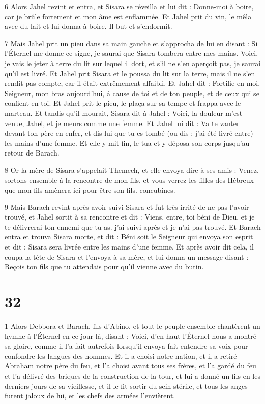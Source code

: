 \par 6 Alors Jahel revint et entra, et Sisara se réveilla et lui dit : Donne-moi à boire, car je brûle fortement et mon âme est enflammée. Et Jahel prit du vin, le mêla avec du lait et lui donna à boire. Il but et s'endormit.

\par 7 Mais Jahel prit un pieu dans sa main gauche et s'approcha de lui en disant : Si l'Éternel me donne ce signe, je saurai que Sisara tombera entre mes mains. Voici, je vais le jeter à terre du lit sur lequel il dort, et s'il ne s'en aperçoit pas, je saurai qu'il est livré. Et Jahel prit Sisara et le poussa du lit sur la terre, mais il ne s'en rendit pas compte, car il était extrêmement affaibli. Et Jahel dit : Fortifie en moi, Seigneur, mon bras aujourd'hui, à cause de toi et de ton peuple, et de ceux qui se confient en toi. Et Jahel prit le pieu, le plaça sur sa tempe et frappa avec le marteau. Et tandis qu'il mourait, Sisara dit à Jahel : Voici, la douleur m'est venue, Jahel, et je meurs comme une femme. Et Jahel lui dit : Va te vanter devant ton père en enfer, et dis-lui que tu es tombé (ou dis : j'ai été livré entre) les mains d'une femme. Et elle y mit fin, le tua et y déposa son corps jusqu'au retour de Barach.

\par 8 Or la mère de Sisara s'appelait Themech, et elle envoya dire à ses amis : Venez, sortons ensemble à la rencontre de mon fils, et vous verrez les filles des Hébreux que mon fils amènera ici pour être son fils. concubines.

\par 9 Mais Barach revint après avoir suivi Sisara et fut très irrité de ne pas l'avoir trouvé, et Jahel sortit à sa rencontre et dit : Viens, entre, toi béni de Dieu, et je te délivrerai ton ennemi que tu as. j'ai suivi après et je n'ai pas trouvé. Et Barach entra et trouva Sisara morte, et dit : Béni soit le Seigneur qui envoya son esprit et dit : Sisara sera livrée entre les mains d'une femme. Et après avoir dit cela, il coupa la tête de Sisara et l'envoya à sa mère, et lui donna un message disant : Reçois ton fils que tu attendais pour qu'il vienne avec du butin.



\chapter{32}

\par 1 Alors Debbora et Barach, fils d'Abino, et tout le peuple ensemble chantèrent un hymne à l'Éternel en ce jour-là, disant : Voici, d'en haut l'Éternel nous a montré sa gloire, comme il l'a fait autrefois lorsqu'il envoya fait entendre sa voix pour confondre les langues des hommes. Et il a choisi notre nation, et il a retiré Abraham notre père du feu, et l'a choisi avant tous ses frères, et l'a gardé du feu et l'a délivré des briques de la construction de la tour, et lui a donné un fils en les derniers jours de sa vieillesse, et il le fit sortir du sein stérile, et tous les anges furent jaloux de lui, et les chefs des armées l'envièrent.

